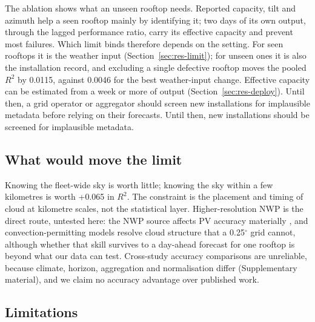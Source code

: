 The ablation shows what an unseen rooftop needs. Reported capacity, tilt and azimuth help a seen rooftop mainly by identifying it; two days of its own output, through the lagged performance ratio, carry its effective capacity and prevent most failures. Which limit binds therefore depends on the setting. For seen rooftops it is the weather input (Section~\ref{sec:res-limit}); for unseen ones it is also the installation record, and excluding a single defective rooftop moves the pooled $R^2$ by 0.0115, against 0.0046 for the best weather-input change. Effective capacity can be estimated from a week or more of output (Section~\ref{sec:res-deploy}). \ifepsr Until then, a grid operator or aggregator should screen new installations for implausible metadata before relying on their forecasts.%
\else Until then, new installations should be screened for implausible metadata.\fi

\subsection{What would move the limit}
\label{sec:disc-limit}

Knowing the fleet-wide sky is worth little; knowing the sky within a few kilometres is worth +0.065 in $R^2$. The constraint is the placement and timing of cloud at kilometre scales, not the statistical layer. Higher-resolution NWP is the direct route, untested here: the NWP source affects PV accuracy materially \citep{Mayer2023}, and convection-permitting models resolve cloud structure that a 0.25$^\circ$ grid cannot, although whether that skill survives to a day-ahead forecast for one rooftop is beyond what our data can test. Cross-study accuracy comparisons are unreliable, because climate, horizon, aggregation and normalisation differ (Supplementary material), and we claim no accuracy advantage over published work.

\subsection{Limitations}
\label{sec:disc-limitations}

